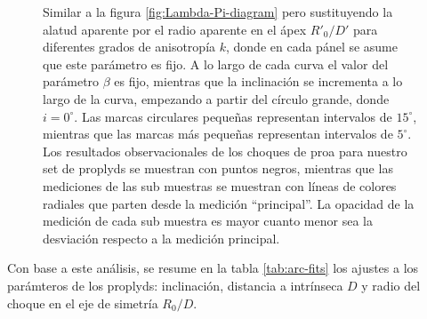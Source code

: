 \begin{figure}
  \caption{Similar a la figura \ref{fig:Lambda-Pi-diagram} pero sustituyendo la alatud aparente por el radio aparente en el ápex $R'_0/D'$ para diferentes grados de anisotropía $k$, donde en cada pánel se asume que este parámetro es fijo. A lo largo de cada curva el valor del parámetro $\beta$ es fijo,  mientras que la inclinación se incrementa a lo largo de la curva, empezando a partir del círculo grande, donde $i=0^\circ$. Las marcas circulares pequeñas representan intervalos de $15^\circ$, mientras que las marcas más pequeñas representan intervalos de $5^\circ$. Los resultados observacionales de los choques de proa para nuestro set de proplyds se muestran con puntos negros, mientras que las mediciones de las sub muestras se muestran con líneas de colores radiales que parten desde la medición ``principal''. La opacidad de la medición de cada sub muestra es mayor cuanto menor sea la desviación respecto a la medición principal.}
  \label{fig:obs-diagnostic}
\end{figure}

Con base a este análisis, se resume en la tabla \ref{tab:arc-fits} los ajustes a los parámteros de los proplyds: inclinación, distancia a \thC{} intrínseca $D$ y radio del choque en el eje de simetría $R_0/D$.

